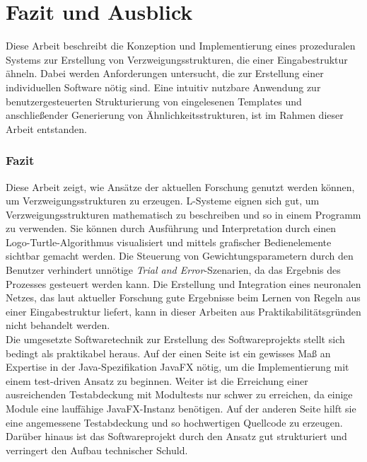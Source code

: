 
\chapter{Fazit und Ausblick}
Diese Arbeit beschreibt die Konzeption und Implementierung eines prozeduralen Systems zur Erstellung
von Verzweigungsstrukturen, die einer Eingabestruktur ähneln.
Dabei werden Anforderungen untersucht, die zur Erstellung einer individuellen Software nötig sind.
Eine intuitiv nutzbare Anwendung zur benutzergesteuerten Strukturierung von eingelesenen Templates und
anschließender Generierung von Ähnlichkeitsstrukturen, ist im Rahmen dieser Arbeit entstanden.

\subsection*{Fazit}
Diese Arbeit zeigt, wie Ansätze der aktuellen Forschung genutzt werden können, um Verzweigungsstrukturen
zu erzeugen.
L-Systeme eignen sich gut, um Verzweigungsstrukturen mathematisch zu beschreiben und so in einem
Programm zu verwenden.
Sie können durch Ausführung und Interpretation durch einen Logo-Turtle-Algorithmus visualisiert
und mittels grafischer Bedienelemente sichtbar gemacht werden.
Die Steuerung von Gewichtungsparametern durch den Benutzer verhindert unnötige
\textit{Trial and Error}-Szenarien, da das Ergebnis des Prozesses gesteuert werden kann.
Die Erstellung und Integration eines neuronalen Netzes, das laut aktueller Forschung gute Ergebnisse beim Lernen von
Regeln aus einer Eingabestruktur liefert, kann in dieser Arbeiten aus Praktikabilitätsgründen nicht behandelt werden.\\
Die umgesetzte Softwaretechnik zur Erstellung des Softwareprojekts stellt sich bedingt als praktikabel
heraus.
Auf der einen Seite ist ein gewisses Maß an Expertise in der Java-Spezifikation JavaFX nötig, um
die Implementierung mit einem test-driven Ansatz zu beginnen.
Weiter ist die Erreichung einer ausreichenden Testabdeckung mit Modultests nur schwer
zu erreichen, da einige Module eine lauffähige JavaFX-Instanz benötigen.
Auf der anderen Seite hilft sie eine angemessene Testabdeckung und so hochwertigen Quellcode
zu erzeugen.
Darüber hinaus ist das Softwareprojekt durch den Ansatz gut strukturiert und verringert
den Aufbau technischer Schuld.

